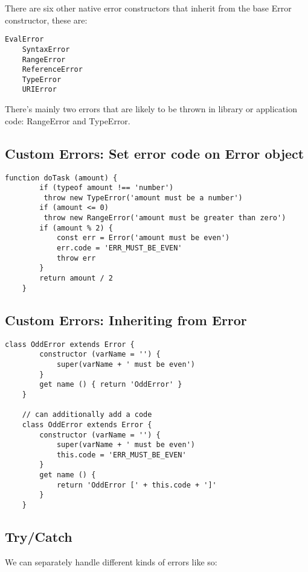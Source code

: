 \documentclass{scrartcl}
\begin{document}
There are six other native error constructors that inherit from the base Error constructor, these are:

\begin{lstlisting}[style=ES6]
    EvalError
    SyntaxError
    RangeError
    ReferenceError
    TypeError
    URIError
\end{lstlisting}

There's mainly two errors that are likely to be thrown in library or application code: RangeError and TypeError.

\subsection{Custom Errors: Set error code on Error object}

\begin{lstlisting}[style=ES6]
    function doTask (amount) {
        if (typeof amount !== 'number')
         throw new TypeError('amount must be a number')
        if (amount <= 0)
         throw new RangeError('amount must be greater than zero')
        if (amount % 2) {
            const err = Error('amount must be even')
            err.code = 'ERR_MUST_BE_EVEN'
            throw err
        }
        return amount / 2
    }
\end{lstlisting}

\subsection{Custom Errors: Inheriting from Error}

\begin{lstlisting}[style=ES6]
    class OddError extends Error {
        constructor (varName = '') {
            super(varName + ' must be even')
        }
        get name () { return 'OddError' }
    }

    // can additionally add a code
    class OddError extends Error {
        constructor (varName = '') {
            super(varName + ' must be even')
            this.code = 'ERR_MUST_BE_EVEN'
        }
        get name () {
            return 'OddError [' + this.code + ']'
        }
    }
\end{lstlisting}

\subsection{Try/Catch}

We can separately handle different kinds of errors like so:
\end{document}
